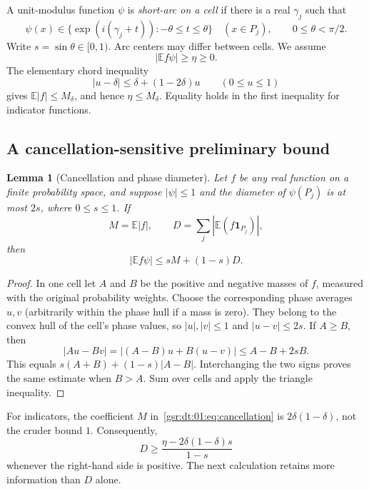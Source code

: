 \documentclass[11pt,letterpaper]{article}
\numberwithin{equation}{section}
\newtheorem{lemma}[theorem]{Lemma}
\theoremstyle{definition}
\theoremstyle{remark}
\newcommand{\E}{\mathbb E}
\newcommand{\one}{\mathbf 1}
\newcommand{\1}{\mathbf 1}
\newcommand{\abs}[1]{\left|#1\right|}
\begin{document}
A unit-modulus function $\psi$ is \emph{short-arc on a cell} if there is a
real $\gamma_j$ such that
\begin{equation}\label{gsr:dt:01:eq:arc}
 \psi(x)\in\{\exp(i(\gamma_j+t)):-\theta\le t\le\theta\}
 \quad(x\in P_j),\qquad 0\le\theta<\pi/2.
\end{equation}
Write $s=\sin\theta\in[0,1)$. Arc centers may differ between cells.
We assume
\begin{equation}\label{gsr:dt:01:eq:eta}
 |\E f\psi|\ge\eta\ge0.
\end{equation}
The elementary chord inequality
\begin{equation}\label{gsr:dt:01:eq:abslinear}
 |u-\delta|\le\delta+(1-2\delta)u\qquad(0\le u\le1)
\end{equation}
gives $\E|f|\le M_\delta$, and hence $\eta\le M_\delta$.
Equality holds in the first inequality for indicator functions.

\subsection{A cancellation-sensitive preliminary bound}

\begin{lemma}[Cancellation and phase diameter]\label{gsr:dt:01:lem:cancellation}
Let $f$ be any real function on a finite probability space, and suppose
$|\psi|\le1$ and the diameter of $\psi(P_j)$ is at most $2s$, where
$0\le s\le1$. If
\[
 M=\E|f|,\qquad D=\sum_j\abs{\E(f\one_{P_j})},
\]
then
\begin{equation}\label{gsr:dt:01:eq:cancellation}
 |\E f\psi|\le sM+(1-s)D.
\end{equation}
\end{lemma}
\begin{proof}
In one cell let $A$ and $B$ be the positive and negative masses of $f$,
measured with the original probability weights. Choose the corresponding phase
averages $u,v$ (arbitrarily within the phase hull if a mass is zero). They
belong to the convex hull of the cell's phase values, so
$|u|,|v|\le1$ and $|u-v|\le2s$. If $A\ge B$, then
\[
 |Au-Bv|=|(A-B)u+B(u-v)|\le A-B+2sB.
\]
This equals $s(A+B)+(1-s)|A-B|$. Interchanging the two signs proves the
same estimate when $B>A$. Sum over cells and apply the triangle inequality.
\end{proof}

For indicators, the coefficient $M$ in~\eqref{gsr:dt:01:eq:cancellation} is
$2\delta(1-\delta)$, not the cruder bound $1$. Consequently,
\begin{equation}\label{gsr:dt:01:eq:Dfrometa}
 D\ge \frac{\eta-2\delta(1-\delta)s}{1-s}
\end{equation}
whenever the right-hand side is positive. The next calculation retains
more information than $D$ alone.
\end{document}
